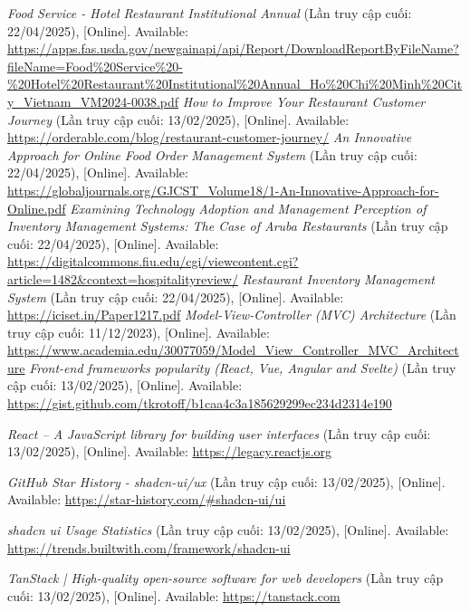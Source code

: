\documentclass[12pt, a4paper]{article}
\begin{document}
\renewcommand{\refname}{\textbf{TÀI LIỆU THAM KHẢO}}
\begin{thebibliography}{}
	 \textit{Food Service - Hotel Restaurant Institutional Annual
	} (Lần truy cập cuối: 22/04/2025), [Online]. Available: \url{https://apps.fas.usda.gov/newgainapi/api/Report/DownloadReportByFileName?fileName=Food\%20Service%20-\%20Hotel\%20Restaurant%20Institutional\%20Annual_Ho\%20Chi\%20Minh\%20City_Vietnam_VM2024-0038.pdf}
	 \textit{How to Improve Your Restaurant Customer Journey
	} (Lần truy cập cuối: 13/02/2025), [Online]. Available: \url{https://orderable.com/blog/restaurant-customer-journey/}
	 \textit{An Innovative Approach for Online Food Order Management System} (Lần truy cập cuối: 22/04/2025), [Online]. Available: \url{https://globaljournals.org/GJCST_Volume18/1-An-Innovative-Approach-for-Online.pdf}
	 \textit{Examining Technology Adoption and Management Perception of Inventory Management Systems: The Case of Aruba Restaurants
	} (Lần truy cập cuối: 22/04/2025), [Online]. Available: \url{https://digitalcommons.fiu.edu/cgi/viewcontent.cgi?article=1482&context=hospitalityreview/}
	 \textit{Restaurant Inventory Management System
	} (Lần truy cập cuối: 22/04/2025), [Online]. Available: \url{https://iciset.in/Paper1217.pdf}
	 \textit{Model-View-Controller (MVC) Architecture} (Lần truy cập cuối: 11/12/2023), [Online]. Available: \url{https://www.academia.edu/30077059/Model_View_Controller_MVC_Architecture}
	 \textit{Front-end frameworks popularity (React, Vue, Angular and Svelte)} (Lần truy cập cuối: 13/02/2025), [Online]. Available: \url{https://gist.github.com/tkrotoff/b1caa4c3a185629299ec234d2314e190}

	 \textit{React – A JavaScript library for building user interfaces} (Lần truy cập cuối: 13/02/2025), [Online]. Available: \url{https://legacy.reactjs.org}

	 \textit{GitHub Star History - shadcn-ui/ux} (Lần truy cập cuối: 13/02/2025), [Online]. Available: \url{https://star-history.com/#shadcn-ui/ui}

	 \textit{shadcn ui Usage Statistics} (Lần truy cập cuối: 13/02/2025), [Online]. Available: \url{https://trends.builtwith.com/framework/shadcn-ui}

	 \textit{TanStack | High-quality open-source software for web developers} (Lần truy cập cuối: 13/02/2025), [Online]. Available: \url{https://tanstack.com}


\end{thebibliography}
\end{document}
